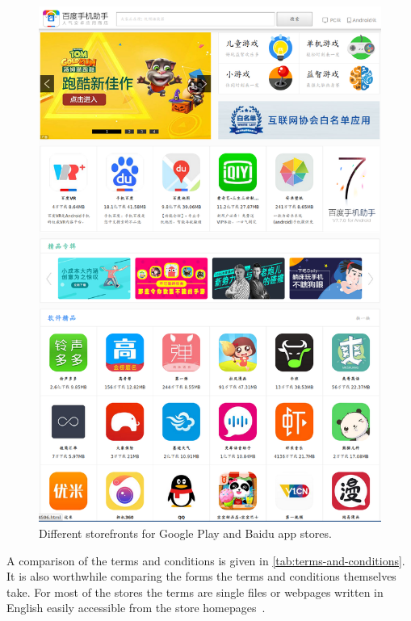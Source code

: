 \documentclass[thesis.tex]{subfiles}
\begin{document}
\begin{figure}
\begin{minipage}{\linewidth}
\begin{minipage}{0.48\linewidth}
      \includegraphics[width=\linewidth]{figures/baidu-storefront.png}
    \end{minipage}
  \end{minipage}
  \caption{Different storefronts for Google Play and Baidu app stores.}
  \label{fig:storefronts}
\end{figure}

A comparison of the terms and conditions is given in \autoref{tab:terms-and-conditions}.
It is also worthwhile comparing the forms the terms and conditions themselves take.
For most of the stores the terms are single files or webpages written in English easily accessible from the store homepages~\cite{noauthor_yandex.store_nodate,noauthor_aptoide_nodate,noauthor_google_nodate,noauthor_amazon.co.uk_nodate}.  
\end{document}
